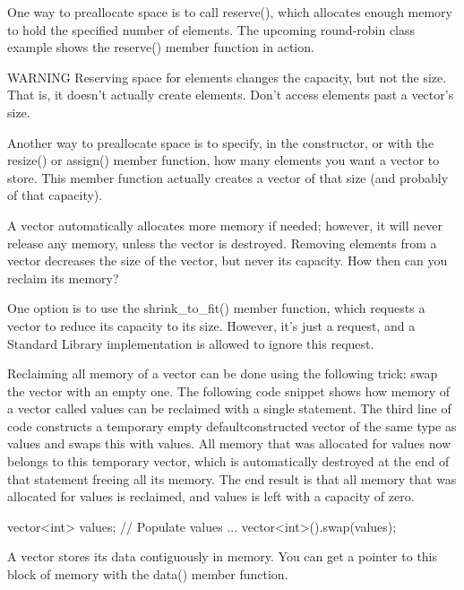 One way to preallocate space is to call reserve(), which allocates enough memory to hold the specified number of elements. The upcoming round-robin class example shows the reserve() member function in action.

\begin{myWarning}{WARNING}
Reserving space for elements changes the capacity, but not the size. That is, it doesn’t actually create elements. Don’t access elements past a vector’s size.
\end{myWarning}

Another way to preallocate space is to specify, in the constructor, or with the resize() or assign() member function, how many elements you want a vector to store. This member function actually creates a vector of that size (and probably of that capacity).


A vector automatically allocates more memory if needed; however, it will never release any memory, unless the vector is destroyed. Removing elements from a vector decreases the size of the vector, but never its capacity. How then can you reclaim its memory?

One option is to use the shrink\_to\_fit() member function, which requests a vector to reduce its capacity to its size. However, it’s just a request, and a Standard Library implementation is allowed to ignore this request.

Reclaiming all memory of a vector can be done using the following trick: swap the vector with an empty one. The following code snippet shows how memory of a vector called values can be reclaimed with a single statement. The third line of code constructs a temporary empty defaultconstructed vector of the same type as values and swaps this with values. All memory that was allocated for values now belongs to this temporary vector, which is automatically destroyed at the end of that statement freeing all its memory. The end result is that all memory that was allocated for values is reclaimed, and values is left with a capacity of zero.

\begin{cpp}
vector<int> values;
// Populate values ...
vector<int>().swap(values);
\end{cpp}


A vector stores its data contiguously in memory. You can get a pointer to this block of memory with the data() member function.

